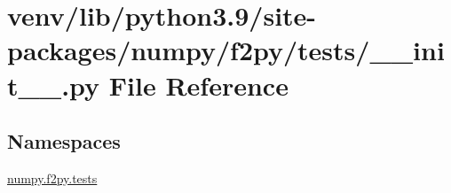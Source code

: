 \hypertarget{venv_2lib_2python3_89_2site-packages_2numpy_2f2py_2tests_2____init_____8py}{}\section{venv/lib/python3.9/site-\/packages/numpy/f2py/tests/\+\_\+\+\_\+init\+\_\+\+\_\+.py File Reference}
\label{venv_2lib_2python3_89_2site-packages_2numpy_2f2py_2tests_2____init_____8py}
\subsection*{Namespaces}
\begin{DoxyCompactItemize}
\item 
 \hyperlink{namespacenumpy_1_1f2py_1_1tests}{numpy.\+f2py.\+tests}
\end{DoxyCompactItemize}
